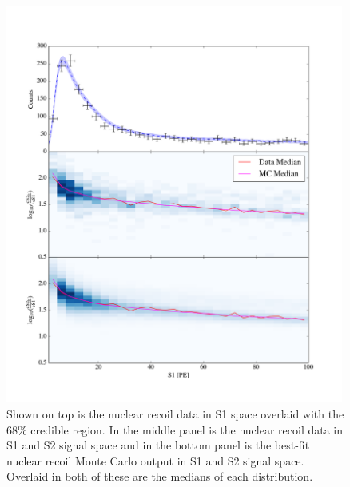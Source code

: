 \begin{figure}[p]
	\centering
	\includegraphics[width=0.99\textwidth]{xe1t_nr_results_s1_2d}
	\caption{Shown on top is the nuclear recoil data in S1 space overlaid with the 68\% credible region.  In the middle panel is the nuclear recoil data in S1 and S2 signal space and in the bottom panel is the best-fit nuclear recoil Monte Carlo output in S1 and S2 signal space.  Overlaid in both of these are the medians of each distribution.}
	\label{fig:xe1t_nr_cal_s1_2d}
\end{figure}


